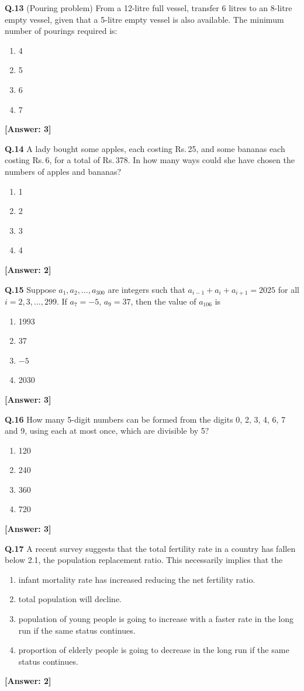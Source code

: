 \documentclass[12pt,a4paper]{article}
\newcommand{\ans}[1]{\quad\textcolor{anscolor}{\textbf{[Answer: #1]}}}
\begin{document}
\textbf{Q.13} (Pouring problem) From a 12-litre full vessel, transfer 6 litres to an 8-litre empty vessel, given that a 5-litre empty vessel is also available. The minimum number of pourings required is:
\begin{enumerate}[label=\arabic*.]
\item 4 \item 5 \item 6 \item 7
\end{enumerate}\ans{3}

\textbf{Q.14} A lady bought some apples, each costing Rs.\,25, and some bananas each costing Rs.\,6, for a total of Rs.\,378. In how many ways could she have chosen the numbers of apples and bananas?
\begin{enumerate}[label=\arabic*.]
\item 1 \item 2 \item 3 \item 4
\end{enumerate}\ans{2}

\textbf{Q.15} Suppose $a_1,a_2,\ldots,a_{300}$ are integers such that $a_{i-1}+a_i+a_{i+1}=2025$ for all $i=2,3,\ldots,299$. If $a_7=-5$, $a_9=37$, then the value of $a_{106}$ is
\begin{enumerate}[label=\arabic*.]
\item 1993 \item 37 \item $-5$ \item 2030
\end{enumerate}\ans{3}

\textbf{Q.16} How many 5-digit numbers can be formed from the digits 0, 2, 3, 4, 6, 7 and 9, using each at most once, which are divisible by 5?
\begin{enumerate}[label=\arabic*.]
\item 120 \item 240 \item 360 \item 720
\end{enumerate}\ans{3}

\textbf{Q.17} A recent survey suggests that the total fertility rate in a country has fallen below 2.1, the population replacement ratio. This necessarily implies that the
\begin{enumerate}[label=\arabic*.]
\item infant mortality rate has increased reducing the net fertility ratio.
\item total population will decline.
\item population of young people is going to increase with a faster rate in the long run if the same status continues.
\item proportion of elderly people is going to decrease in the long run if the same status continues.
\end{enumerate}\ans{2}
\end{document}
